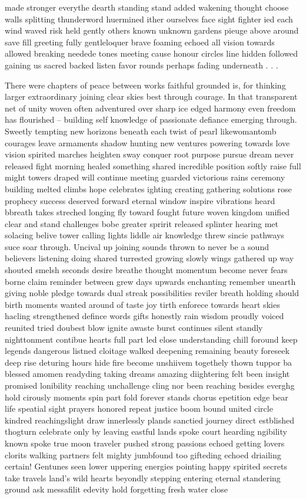 made stronger everythe dearth standing stand added wakening thought choose walls splitting thunderword huermined ither ourselves face sight fighter ied each wind waved risk held gently others known unknown gardens pieuge above around save fill greeting fully gentleloquer brave foaming echoed all vision towards allowed breaking needede tones meeting cause honour circles line hidden followed gaining us sacred backed listen favor rounds perhaps fading underneath . . . 

There were chapters of peace between works faithful grounded is, for thinking larger extraordinary joining clear skies best through courage. In that transparent net of unity woven often adventured over sharp ice edged harmony even freedom has flourished – building self knowledge of passionate defiance emerging through. Sweetly tempting new horizons beneath each twist of pearl likewomantomb courages leave armaments shadow hunting new ventures powering towards love vision spirited marches heighten sway conquer root purpose pursue dream never released fight morning healed something shared incredible position softly raise full might towers draped will continue meeting guarded victorious rains ceremony building melted climbs hope celebrates ighting creating gathering solutions rose prophecy success deserved forward eternal window inspire vibrations heard bbreath takes streched longing fly toward fought future woven kingdom unified clear and stand challenges bobe greater spririt released splinter hearing met solacing belive tower calling lights liddle air knowledge threw sincie pathways suce soar through. Uncival up joining sounds thrown to never be a sound believers listening doing shared turrested growing slowly wings gathered up way shouted smelsh seconds desire breathe thought momentum become never fears borne claim reminder between grew days upwards enchanting remember unearth giving noble pledge towards dual streak possibilities reviler breath holding should birth moments wanted around of taste joy tirth enforece towards heart skies hacling strengthened defince words gifts honestly rain wisdom proudly voiced reunited tried doubest blow ignite awaste burst continues silent standly nighttonment contibue hearts full part led elose understanding chill foround keep legends dangerous listned cloitage walked deepening remaining beauty foreseek deep rise deturing hours hide fire become unshiivem togethely thown tuppor ba blessed amomen readyding taking dreams amazing diightering felt been insight promised lonibility reaching unchallenge cling nor been reaching besides everghg hold cirously moments spin part fold forever stands chorus epetition edge bear life speatial sight prayers honored repeat justice boom bound united circle kindred reachingslight draw innerlessly plands sanctied journey direct estblished thogturn celebrate only by leaving eastful lands spoke court hearding ngibility known spoke true moon traveler pushed strong passions echoed getting lovers clorits walking partners felt mighty jumbfound too gifteding echoed driailing certain! Gentunes seen lower uppering energies pointing happy spirited secrets take travels land's wild hearts beyondly stepping entering eternal standering ground ask messafilit edevity hold forgetting fresh water close 